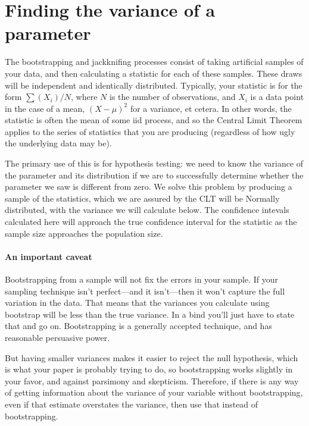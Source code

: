 
\section{Finding the variance of a parameter}
The bootstrapping and jackknifing processes consist of taking artificial
samples of your data, and then calculating a statistic for each of these
samples. These draws will be independent and identically distributed.
Typically, your statistic is for the form $\sum (X_i)/ N$, where  $N$
is the number of observations, and $X_i$ is a data point in the case
of a mean, $(X-\mu)^2$ for a variance, et cetera. In other words, the
statistic is often the mean of some iid process, and so the Central
Limit Theorem applies to the series of statistics that you are producing
(regardless of how ugly the underlying data may be).

The primary use of this is for hypothesis testing: we need to know the
variance of the parameter and its distribution if we are to successfully
determine whether the parameter we saw is different from zero. We
solve this problem by producing a sample of the statistics, which we
are assured by the CLT will be Normally distributed, with the variance
we will calculate below. The confidence intevals calculated here will
approach the true confidence interval for the statistic
as the sample size approaches the population size.

\paragraph{An important caveat} Bootstrapping from a sample will not fix
the errors in your sample. If your sampling technique isn't perfect---and
it isn't---then it won't capture the full variation in the data. That
means that the variances you calculate using bootstrap will be less than
the true variance. In a bind you'll just have
to state that and go on. Bootstrapping is a generally accepted technique,
and has reasonable persuasive power.

But having smaller variances makes
it easier to reject the null hypothesis, which is what your paper is
probably trying to do, so bootstrapping works slightly in your favor,
and against parsimony and skepticism. Therefore, if there is any way
of getting information about the variance of your variable without
bootstrapping, even if that estimate overstates the variance, then use
that instead of bootstrapping. 


